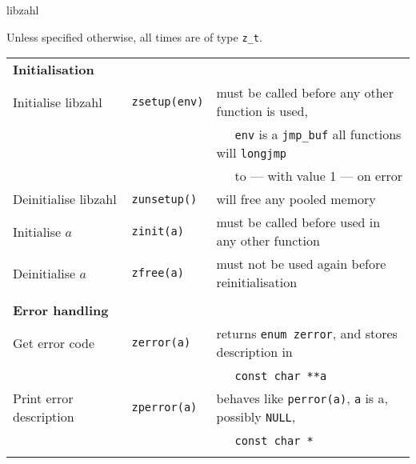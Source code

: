 \documentclass[10pt,draft]{article}
\begin{document}
{\Huge libzahl}
\vspace{1em plus .2em minus .1em}

Unless specified otherwise, all times are of type {\tt z\_t}.
\vspace{2em plus .4em minus .2em}

\begin{tabular}{lll}
\textbf{Initialisation}       & {}                         & {}                                                \\
Initialise libzahl            & {\tt zsetup(env)}          & must be called before any other function is used, \\
{}                            & {}                         & $~~~~~$ {\tt env} is a {\tt jmp\_buf} all
                                                                     functions will {\tt longjmp}              \\
{}                            & {}                         & $~~~~~$ to --- with value 1 --- on error          \\
Deinitialise libzahl          & {\tt zunsetup()}           & will free any pooled memory                       \\
Initialise $a$                & {\tt zinit(a)}             & must be called before used in any other function  \\
Deinitialise $a$              & {\tt zfree(a)}             & must not be used again before reinitialisation    \\
\\

\textbf{Error handling}       & {}                         & {}                                                \\
Get error code                & {\tt zerror(a)}            & returns {\tt enum zerror},
                                                                     and stores description in                 \\
{}                            & {}                         & $~~~~~$ {\tt const char **a}                      \\
Print error description       & {\tt zperror(a)}           & behaves like {\tt perror(a)}, {\tt a} is a,
                                                                     possibly {\tt NULL},                      \\
{}                            & {}                         & $~~~~~$ {\tt const char *}                        \\
\\


\end{tabular}
\end{document}
